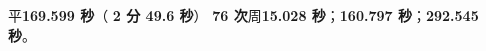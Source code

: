 \documentclass[11pt,a4paper]{article}
\numberwithin{equation}{section}
\numberwithin{figure}{section}
\begin{document}
{\cjkfont 平}\allowbreak{}\textbf{169.599 {\cjkfont 秒}\allowbreak{}}{\cjkfont （}\allowbreak{} \textbf{2 {\cjkfont 分}\allowbreak{} 49.6 {\cjkfont 秒}\allowbreak{}}{\cjkfont ）}\allowbreak{} \textbf{76 {\cjkfont 次}\allowbreak{}}{\cjkfont 周}\allowbreak{}\textbf{15.028 {\cjkfont 秒}\allowbreak{}}{\cjkfont ；}\allowbreak{}\textbf{160.797 {\cjkfont 秒}\allowbreak{}}{\cjkfont ；}\allowbreak{}\textbf{292.545 {\cjkfont 秒}\allowbreak{}}{\cjkfont 。}\allowbreak{}
\end{document}
